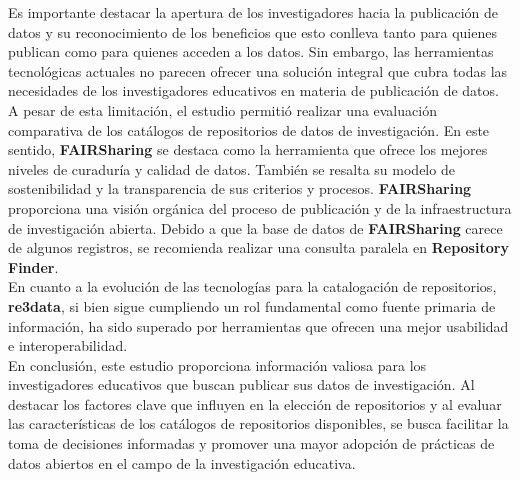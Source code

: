 \documentclass[runningheads]{llncs}
\begin{document}
Es importante destacar la apertura de los investigadores hacia la publicación de datos y su reconocimiento de los beneficios que esto conlleva tanto para quienes publican como para quienes acceden a los datos. Sin embargo, las herramientas tecnológicas actuales no parecen ofrecer una solución integral que cubra todas las necesidades de los investigadores educativos en materia de publicación de datos.\\

A pesar de esta limitación, el estudio permitió realizar una evaluación comparativa de los catálogos de repositorios de datos de investigación. En este sentido, \textbf{FAIRSharing} se destaca como la herramienta que ofrece los mejores niveles de curaduría y calidad de datos. También se resalta su modelo de sostenibilidad y la transparencia de sus criterios y procesos. \textbf{FAIRSharing} proporciona una visión orgánica del proceso de publicación y de la infraestructura de investigación abierta. Debido a que la base de datos de \textbf{FAIRSharing} carece de algunos registros, se recomienda realizar una consulta paralela en \textbf{Repository Finder}.\\

En cuanto a la evolución de las tecnologías para la catalogación de repositorios, \textbf{re3data}, si bien sigue cumpliendo un rol fundamental como fuente primaria de información, ha sido superado por herramientas que ofrecen una mejor usabilidad e interoperabilidad.\\

En conclusión, este estudio proporciona información valiosa para los investigadores educativos que buscan publicar sus datos de investigación. Al destacar los factores clave que influyen en la elección de repositorios y al evaluar las características de los catálogos de repositorios disponibles, se busca facilitar la toma de decisiones informadas y promover una mayor adopción de prácticas de datos abiertos en el campo de la investigación educativa.




\end{document}
